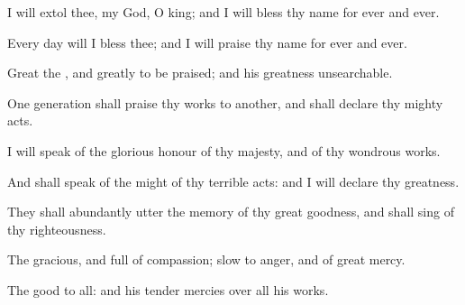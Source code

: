 {\Q {}I will
extol thee, my
God, O
king; and I will
bless thy
name for
ever and
ever.


\par }{\Q {}Every
day will I
bless thee; and I will
praise thy
name for
ever and
ever.


\par }{\Q {}Great
{} the
{}, and
greatly to be
praised; and his
greatness
{}
unsearchable.


\par }{\Q {}One
generation shall
praise thy
works to another, and shall
declare thy mighty
acts.


\par }{\Q {}I will
speak of the
glorious
honour of thy
majesty, and of thy
wondrous
works.


\par }{\Q {}And
{} shall
speak of the
might of thy terrible
acts: and I will
declare thy
greatness.


\par }{\Q {}They shall abundantly
utter the
memory of thy
great
goodness, and shall
sing of thy
righteousness.


\par }{\Q {}The
{}
{}
gracious, and full of
compassion;
slow to
anger, and of
great
mercy.


\par }{\Q {}The
{}
{}
good to all: and his tender
mercies
{} over all his
works.


\par }{\BB \par }
